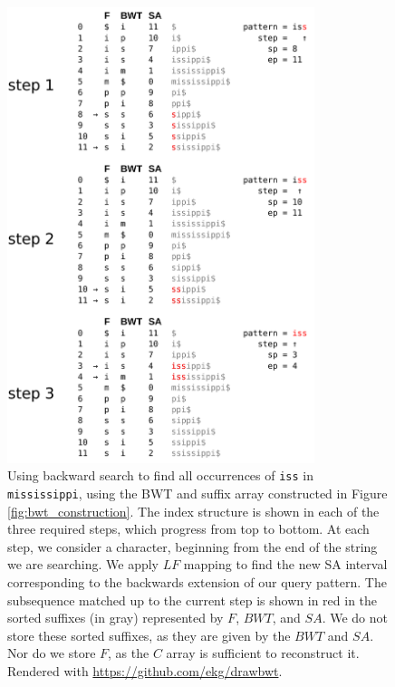 \begin{figure}[htbp!]
  \centering
  \includegraphics[width=0.8\textwidth]{Chapter2/Figs/mississippi_iss_search.pdf}
  \caption[Backward search in the BWT and suffix array]{
    Using backward search to find all occurrences of {\tt iss} in {\tt mississippi}, using the BWT and suffix array constructed in Figure \ref{fig:bwt_construction}.
    The index structure is shown in each of the three required steps, which progress from top to bottom.
    At each step, we consider a character, beginning from the end of the string we are searching.
    We apply $LF$ mapping to find the new SA interval corresponding to the backwards extension of our query pattern.
    The subsequence matched up to the current step is shown in red in the sorted suffixes (in gray) represented by $F$, $BWT$, and $SA$.
    We do not store these sorted suffixes, as they are given by the $BWT$ and $SA$.
    Nor do we store $F$, as the $C$ array is sufficient to reconstruct it.
    Rendered with \url{https://github.com/ekg/drawbwt}.
  }
  \label{fig:bwt_search}
\end{figure}

